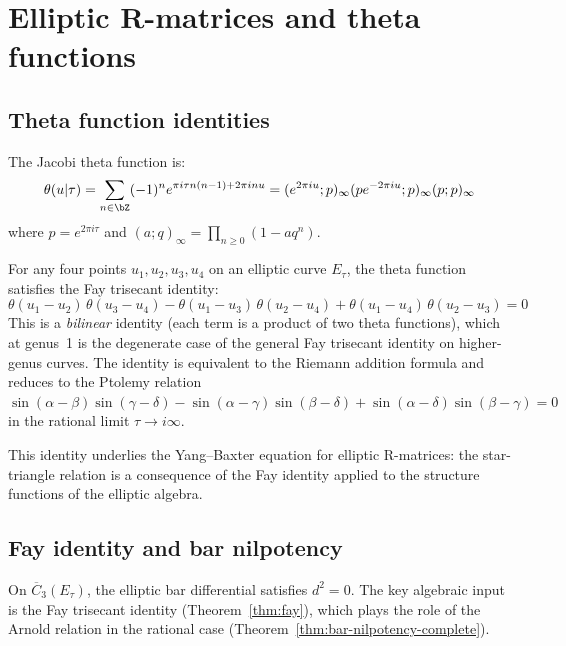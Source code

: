 \section{Elliptic R-matrices and theta functions}
\label{sec:elliptic-r-theta}

\subsection{Theta function identities}

\begin{definition}\label{def:theta}
The Jacobi theta function is:
\[
\theta(u | \tau) = \sum_{n \in \bZ} (-1)^n e^{\pi i \tau n(n-1) + 2\pi i n u} =
(e^{2\pi iu}; p)_\infty (p e^{-2\pi iu}; p)_\infty (p; p)_\infty
\]
where $p = e^{2\pi i \tau}$ and $(a; q)_\infty = \prod_{n \geq 0}(1 - aq^n)$.
\end{definition}

\begin{theorem}\label{thm:fay}
For any four points $u_1, u_2, u_3, u_4$ on an elliptic curve $E_\tau$, the theta function
satisfies the Fay trisecant identity:
\[
\theta(u_1 - u_2)\,\theta(u_3 - u_4) - \theta(u_1 - u_3)\,\theta(u_2 - u_4) + \theta(u_1 - u_4)\,\theta(u_2 - u_3) = 0
\]
This is a \emph{bilinear} identity (each term is a product of two theta functions), which at genus~1 is the degenerate case of the general Fay trisecant identity on higher-genus curves. The identity is equivalent to the Riemann addition formula and reduces to the Ptolemy relation $\sin(\alpha-\beta)\sin(\gamma-\delta) - \sin(\alpha-\gamma)\sin(\beta-\delta) + \sin(\alpha-\delta)\sin(\beta-\gamma) = 0$ in the rational limit $\tau \to i\infty$.

This identity underlies the Yang--Baxter equation for elliptic R-matrices:
the star-triangle relation is a consequence of the Fay identity applied to the
structure functions of the elliptic algebra.
\end{theorem}


\subsection{Fay identity and bar nilpotency}

\begin{proposition}[Fay identity implies elliptic \texorpdfstring{$d^2 = 0$}{d2 = 0};
\ClaimStatusProvedHere]\label{prop:fay-implies-d-squared}
On $\overline{C}_3(E_\tau)$, the elliptic bar differential satisfies
$d^2 = 0$. The key algebraic input is the Fay trisecant identity
(Theorem~\ref{thm:fay}), which plays the role of the Arnold relation
in the rational case (Theorem~\ref{thm:bar-nilpotency-complete}).
\end{proposition}

